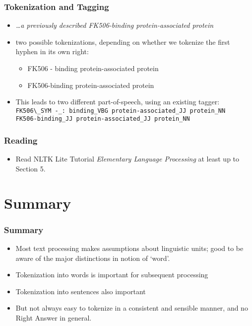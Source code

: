 \begin{frame}[fragile]
  \frametitle{Tokenization and Tagging}
  \begin{itemize}
  \item \textit{\ldots a previously described FK506-binding
      protein-associated protein}\\
  \item two possible tokenizations, depending on whether we tokenize
    the first hyphen in its own right:
    \begin{itemize}
    \item FK506 - binding protein-associated protein
    \item FK506-binding protein-associated protein
    \end{itemize}
  \item This leads to two different part-of-speech, using an existing
    tagger:
{\small
  \verb!FK506\_SYM -_: binding_VBG protein-associated_JJ protein_NN!\\
  \verb!FK506-binding_JJ protein-associated_JJ protein_NN!
}
  \end{itemize}

\end{frame}
\begin{frame}[fragile]
  \frametitle{Reading}

  \begin{itemize}
  \item Read NLTK Lite Tutorial \textit{Elementary Language Processing} at least up to
    Section 5.
  \end{itemize}
\end{frame}




\section{Summary}

\begin{frame}
  \frametitle{Summary}

  \begin{itemize}
  \item Most text processing makes assumptions about linguistic units;
    good to be aware of the major distinctions in notion of `word'.
  \item Tokenization into words is important for subsequent processing
  \item Tokenization into sentences also important
  \item But not always easy to tokenize in a consistent and sensible
    manner, and no Right Answer in general.
  \end{itemize}
\end{frame}




